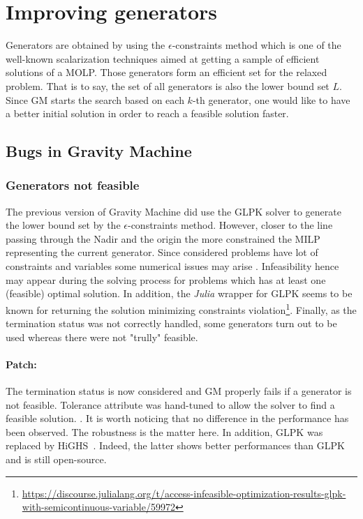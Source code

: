 \section{Improving generators}
Generators are obtained by using the $\epsilon$-constraints method which is one of the well-known scalarization techniques \cite{Chankong1983MultiobjectiveDM} aimed at getting a sample of efficient solutions of a MOLP. Those generators form an efficient set for the relaxed problem. That is to say, the set of all generators is also the lower bound set $L$. Since GM starts the search based on each $k$-th generator, one would like to have a better initial solution in order to reach a feasible solution faster.

\subsection{Bugs in Gravity Machine}

\subsubsection{Generators not feasible}
The previous version of Gravity Machine did use the GLPK solver to generate the lower bound set by the $\epsilon$-constraints method. 
However, closer to the line passing through the Nadir and the origin the more constrained the MILP representing the current generator. 
Since considered problems have lot of constraints and variables some numerical issues may arise \cite{gurobiNumIssues}. Infeasibility hence
may appear during the solving process for problems which has at least one (feasible) optimal solution. In addition, the \textit{Julia} wrapper
for GLPK seems to be known for returning the solution minimizing constraints violation\footnote{\url{https://discourse.julialang.org/t/access-infeasible-optimization-results-glpk-with-semicontinuous-variable/59972}}.
Finally, as the termination status was not correctly handled, some generators turn out to be used whereas there were not "trully" feasible.
\paragraph*{Patch:}
The termination status is now considered and GM properly fails if a generator is not feasible. 
Tolerance attribute was hand-tuned to allow the solver to find a feasible solution. .
It is worth noticing that no difference in the performance has been observed. The robustness is the matter here.
In addition, GLPK was replaced by HiGHS~\cite{highs}. Indeed, the latter shows better performances than GLPK~\cite{bench_solver} and is still open-source.

